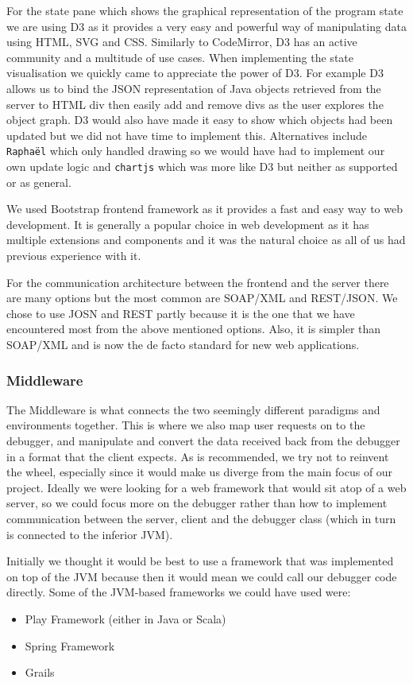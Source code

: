 \documentclass[11pt, a4paper]{article}
\newcommand{\cmd}[1]{{\tt #1}}
\begin{document}
For the state pane which shows the graphical representation of the program state we are using D3\cite{D3} as it provides a very easy and powerful way of manipulating data using HTML, SVG and CSS.
Similarly to CodeMirror, D3 has an active community and a multitude of use cases.
When implementing the state visualisation we quickly came to appreciate the power of D3.
For example D3 allows us to bind the JSON representation of Java objects retrieved from the server to HTML div then easily add and remove divs as the user explores the object graph.
D3 would also have made it easy to show which objects had been updated but we did not have time to implement this.
Alternatives include \cmd{Rapha\"el} which only handled drawing so we would have had to implement our own update logic and
\cmd{chartjs} which was more like D3 but neither as supported or as general.

We used Bootstrap\cite{Bootstrap} frontend framework as it provides a fast and easy way to web development.
It is generally a popular choice in web development as it has multiple extensions and components and it was the natural choice as all of us had previous experience with it.

For the communication architecture between the frontend and the server there are many options but the most common are SOAP/XML and REST/JSON.
We chose to use JOSN and REST partly because it is the one that we have encountered most from the above mentioned options.
Also, it is simpler than SOAP/XML and is now the de facto standard for new web applications.

\subsubsection{Middleware}
The Middleware is what connects the two seemingly different paradigms and
environments together.  This is where we also map user requests on to the
debugger, and manipulate and convert the data received back from the debugger in
a format that the client expects.  As is recommended, we try not to reinvent the
wheel, especially since it would make us diverge from the main focus of our
project.  Ideally we were looking for a web framework that would sit atop of a
web server, so we could focus more on the debugger rather than how to implement
communication between the server, client and the debugger class (which in turn
is connected to the inferior JVM).

Initially we thought it would be best to use a framework that was implemented on
top of the JVM because then it would mean we could call our debugger code
directly.  Some of the JVM-based frameworks we could have used were:
\begin{itemize}
  \item Play Framework (either in Java or Scala)
  \item Spring Framework
  \item Grails
\end{itemize}
\end{document}
